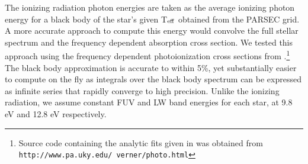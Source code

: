 \documentclass[twocolumn]{aastex61}
\begin{document}
The ionizing radiation photon energies are taken as the average ionizing photon energy for a black body of the star's given T$_{\rm eff}$ obtained from the PARSEC grid. A more accurate approach to compute this energy would convolve the full stellar spectrum and the frequency dependent absorption cross section. We tested this approach using the frequency dependent photoionization cross sections from \citet{1996ApJ...465..487V}.\footnote{Source code containing the analytic fits given in \citet{1996ApJ...465..487V} was obtained from \texttt{http://www.pa.uky.edu/~verner/photo.html}} The black body approximation is accurate to within 5\%, yet substantially easier to compute on the fly as integrals over the black body spectrum can be expressed as infinite series that rapidly converge to high precision. Unlike the ionizing radiation, we assume constant FUV and LW band energies for each star, at 9.8 eV and 12.8 eV respectively.
\end{document}
